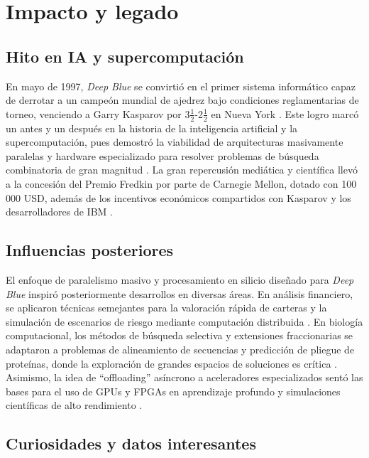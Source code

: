 \documentclass[a4paper, 12pt]{article}
\begin{document}
\section{Impacto y legado}

\subsection{Hito en IA y supercomputación}

En mayo de 1997, \textit{Deep Blue} se convirtió en el primer 
sistema informático capaz de derrotar a un campeón mundial de 
ajedrez bajo condiciones reglamentarias de torneo, venciendo a 
Garry Kasparov por 3\(\frac{1}{2}\)-2\(\frac{1}{2}\) en 
Nueva York \cite{wired1997}\cite{wikideepblue}. Este logro 
marcó un antes y un después en la historia de la inteligencia 
artificial y la supercomputación, pues demostró la viabilidad 
de arquitecturas masivamente paralelas y hardware especializado 
para resolver problemas de búsqueda combinatoria de gran 
magnitud \cite{wired1997}. La gran repercusión mediática y 
científica llevó a la concesión del Premio Fredkin por parte 
de Carnegie Mellon, dotado con 100 000 USD, además de los 
incentivos económicos compartidos con Kasparov y los 
desarrolladores de IBM \cite{wikideepblue}\cite{time2013}.  

\subsection{Influencias posteriores}

El enfoque de paralelismo masivo y procesamiento en silicio 
diseñado para \textit{Deep Blue} inspiró posteriormente 
desarrollos en diversas áreas. En análisis financiero, se 
aplicaron técnicas semejantes para la valoración rápida de 
carteras y la simulación de escenarios de riesgo mediante 
computación distribuida \cite{wired2015}. En biología 
computacional, los métodos de búsqueda selectiva y extensiones 
fraccionarias se adaptaron a problemas de alineamiento de 
secuencias y predicción de pliegue de proteínas, donde la 
exploración de grandes espacios de soluciones es crítica 
\cite{newyorker2006}. Asimismo, la idea de “offloading” 
asíncrono a aceleradores especializados sentó las bases para el 
uso de GPUs y FPGAs en aprendizaje profundo y simulaciones 
científicas de alto rendimiento \cite{newyorker2006}.  

\subsection{Curiosidades y datos interesantes}
\end{document}
